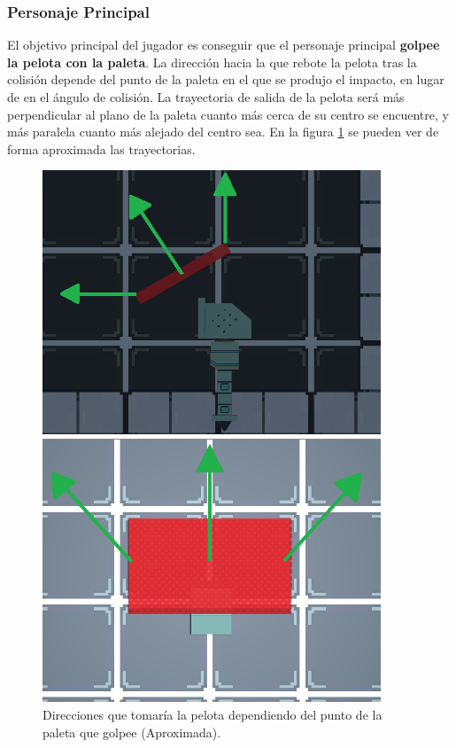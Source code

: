 \subsubsection{Personaje Principal}
El objetivo principal del jugador es conseguir que el personaje principal \textbf{golpee la pelota con la paleta}. La dirección hacia la que rebote la pelota tras la colisión depende del punto de la paleta en el que se produjo el impacto, en lugar de en el ángulo de colisión. La trayectoria de salida de la pelota será más perpendicular al plano de la paleta cuanto más cerca de su centro se encuentre, y más paralela cuanto más alejado del centro sea. En la figura \ref{paddle_direction} se pueden ver de forma aproximada las trayectorias.
\begin{figure}[!htb]
   \begin{minipage}{0.49\textwidth}
     \centering
     \includegraphics[width=0.9\textwidth, right]{images/estructura/fisica/paddle_direction_side}
   \end{minipage}\hfill
   \begin {minipage}{0.49\textwidth}
     \centering
     \includegraphics[width=0.9\textwidth, left]{images/estructura/fisica/paddle_direction_top}
   \end{minipage}
   \caption{Direcciones que tomaría la pelota dependiendo del punto de la paleta que golpee (Aproximada).}
   \label{paddle_direction}
\end{figure}

